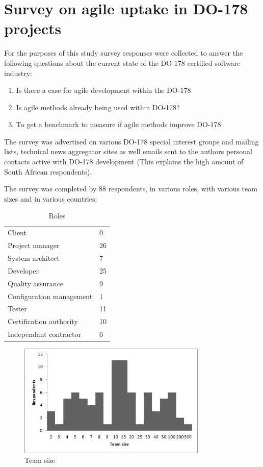\documentclass{sig-alternate-05-2015}
\begin{document}
\section{Survey on agile uptake in DO-178 projects}
For the purposes of this study survey responses were collected to answer the following questions about the current state of the DO-178 certified software industry:
\begin{enumerate}
	\item Is there a case for agile development within the DO-178 %
	\item Is agile methods already being used within DO-178?
	\item To get a benchmark to measure if agile methods improve DO-178 %
\end{enumerate} 

The survey was advertised on various DO-178 special interest groups and mailing lists, technical news aggregator sites as well emails sent to the authors personal contacts active with DO-178 development (This explains the high amount of South African respondents).

The survey was completed by 88 respondents, in various roles, with various team sizes and in various countries:
\begin{table}[]
	\centering
	\caption{Roles}
	\label{Roles}
	\begin{tabular}{l|l}
		Client          			& 0    \\
		Project manager 			& 26   \\
		System architect 			& 7    \\
		Developer 					& 25   \\
		Quality assurance 			& 9    \\
		Configuration management 	& 1    \\
		Tester 						& 11   \\
		Certification authority 	& 10   \\
		Independant contractor 		& 6  
	\end{tabular}
\end{table}

\begin{figure}[t!]
	\centering
	\includegraphics[width=90mm]{Teams.png}
	\caption{Team size}
\end{figure}
\end{document}
